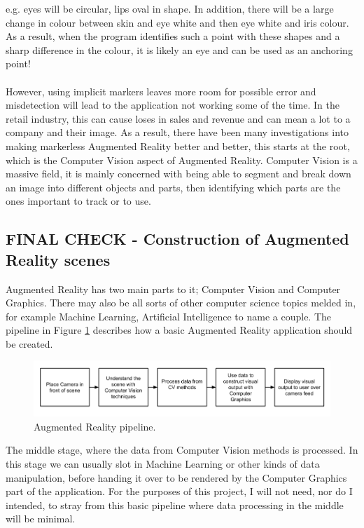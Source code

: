 \documentclass[11pt]{article}
\begin{document}
e.g. eyes will be circular, lips oval in shape. In addition, there will
be a large change in colour between skin and eye white and then eye white
and iris colour. As a result, when the program identifies such a point with 
these shapes and a sharp difference in the colour, it
is likely an eye and can be used as an anchoring point!\\
\\
However, using implicit markers leaves more room for possible error and
misdetection will lead to the application not working some of the
time. In the retail industry, this can cause loses in sales and revenue 
and can mean a lot to a company and their image. As a result, there
have been many investigations into making markerless Augmented Reality
better and better, this starts at the root, which is the Computer
Vision aspect of Augmented Reality. Computer Vision is a massive field, it is
mainly concerned with being able to segment and break
down an image into different objects and parts, then identifying which
parts are the ones important to track or to use.

\subsection{FINAL CHECK - Construction of Augmented Reality scenes}
Augmented Reality has two main parts to it; Computer Vision and Computer Graphics.
There may also be all sorts of other computer science topics melded in, for
example Machine Learning, Artificial Intelligence to name a couple. 
The pipeline in Figure \ref{fig:arpipeline} describes how a basic Augmented Reality 
application should be created.\\

\begin{figure} 
	\includegraphics[scale=0.5]{pics/ARpipeline}
	\caption{Augmented Reality pipeline.}
	\label{fig:arpipeline}
\end{figure}

The middle stage, where the data from Computer Vision methods is processed. 
In this stage we can usually slot in Machine Learning or other kinds 
of data manipulation, before handing it over to be rendered by the Computer
Graphics part of the application. For the purposes of this project, I will not need,
nor do I intended, to stray from this basic pipeline where data processing in 
the middle will be minimal.
\end{document}
